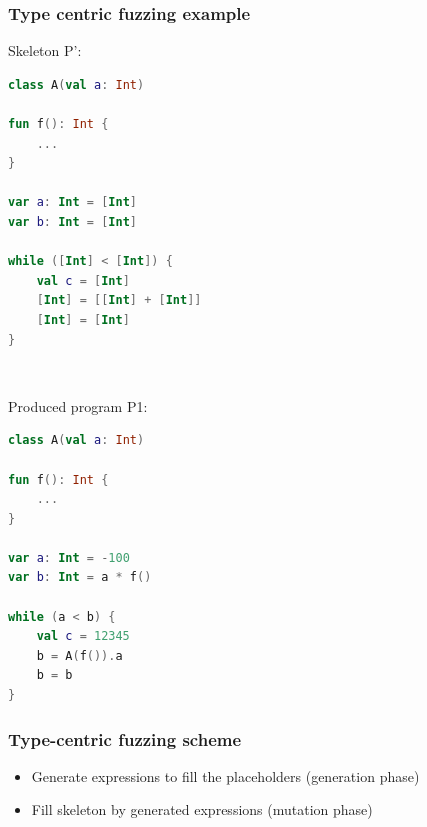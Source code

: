 \begin{frame}[fragile]
	\frametitle{Type centric fuzzing example}
\begin{minipage}{0.4\linewidth}
Skeleton P':
		\begin{lstlisting}[language=Kotlin,basicstyle=\footnotesize]
class A(val a: Int)

fun f(): Int {
    ...
}

var a: Int = [Int]
var b: Int = [Int]

while ([Int] < [Int]) {
    val c = [Int]
    [Int] = [[Int] + [Int]]
    [Int] = [Int]
}
 \end{lstlisting}
	\end{minipage}
	\begin{minipage}{0.1\linewidth}
	\ \ 
	\end{minipage}
	\begin{minipage}{0.4\linewidth}
Produced program P1:
		\begin{lstlisting}[language=Kotlin,basicstyle=\footnotesize]
class A(val a: Int)

fun f(): Int {
    ...
}

var a: Int = -100
var b: Int = a * f()

while (a < b) {
    val c = 12345
    b = A(f()).a
    b = b
}
	\end{lstlisting}
\end{minipage}
	
\end{frame}


\begin{frame}
	\frametitle{Type-centric fuzzing scheme}
		\begin{itemize}
			\item Generate expressions to fill the placeholders (generation phase)
			\item Fill skeleton by generated expressions (mutation phase)
		\end{itemize}
\end{frame}

